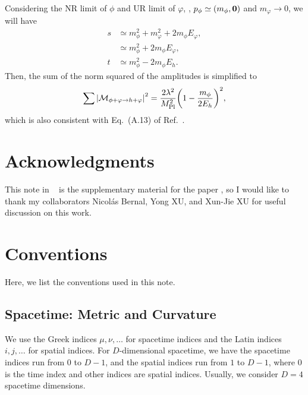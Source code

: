 \documentclass{article}
\begin{document}
            Considering the NR limit of $\phi$ and UR limit of $\varphi$, \ie, $p_\phi \simeq \qty(m_\phi, \vb{0})$ and $m_\varphi \to 0$, we will have
            \begin{equation}
                \begin{aligned}
                    s & \simeq m_\phi^2 + m_\varphi^2 + 2 m_\phi E_\varphi, \\
                    & \simeq m_\phi^2 + 2 m_\phi E_\varphi, \\
                    t & \simeq m_\phi^2 - 2 m_\phi E_h.
                \end{aligned}
            \end{equation}
            Then, the sum of the norm squared of the amplitudes is simplified to
            \begin{equation}
                \sumMsqr[\phi + \varphi \to h + \varphi] = \frac{2 \lambda^2}{\MPl^2} \qty(1 - \frac{m_\phi}{2 E_h})^2,
            \end{equation}
            which is also consistent with Eq.~(A.13) of Ref.~\cite{Xu:2024fjl}.

    \section*{Acknowledgments}
    
        This note in \faGithub~\githubsrc{} is the supplementary material for the paper , so I would like to thank my collaborators Nicolás Bernal, Yong XU, and Xun-Jie XU for useful discussion on this work.

    \clearpage
    \appendix

    \section{Conventions}\label{app:convention}

        Here, we list the conventions used in this note.

        \subsection{Spacetime: Metric and Curvature}
        
            We use the Greek indices $\mu, \nu, \ldots$ for spacetime indices and the Latin indices $i, j, \ldots$ for spatial indices.
            For $D$-dimensional spacetime, we have the spacetime indices run from $0$ to $D - 1$, and the spatial indices run from $1$ to $D - 1$, where $0$ is the time index and other indices are spatial indices.
            Usually, we consider $D = 4$ spacetime dimensions.
\end{document}
